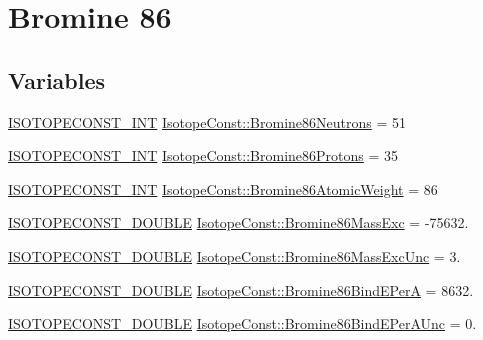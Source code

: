 \hypertarget{group___isotope_const-_bromine-_br86}{}\section{Bromine 86}
\label{group___isotope_const-_bromine-_br86}
\subsection*{Variables}
\begin{DoxyCompactItemize}
\item 
\mbox{\hyperlink{group___isotope_const-_macros_ga5f18360b3e99483a35c32d789e62621c}{I\+S\+O\+T\+O\+P\+E\+C\+O\+N\+S\+T\+\_\+\+I\+NT}} \mbox{\hyperlink{group___isotope_const-_bromine-_br86_gad9eb59cf3d3d80dbf95bb31a09ee368a}{Isotope\+Const\+::\+Bromine86\+Neutrons}} = 51
\item 
\mbox{\hyperlink{group___isotope_const-_macros_ga5f18360b3e99483a35c32d789e62621c}{I\+S\+O\+T\+O\+P\+E\+C\+O\+N\+S\+T\+\_\+\+I\+NT}} \mbox{\hyperlink{group___isotope_const-_bromine-_br86_ga6bf875a742fc88a09f3f350b8414d306}{Isotope\+Const\+::\+Bromine86\+Protons}} = 35
\item 
\mbox{\hyperlink{group___isotope_const-_macros_ga5f18360b3e99483a35c32d789e62621c}{I\+S\+O\+T\+O\+P\+E\+C\+O\+N\+S\+T\+\_\+\+I\+NT}} \mbox{\hyperlink{group___isotope_const-_bromine-_br86_ga7f596459dbaf3f36ede84da4ed1e4b80}{Isotope\+Const\+::\+Bromine86\+Atomic\+Weight}} = 86
\item 
\mbox{\hyperlink{group___isotope_const-_macros_ga8f45a7272ce02c0b4c65c44636ed719a}{I\+S\+O\+T\+O\+P\+E\+C\+O\+N\+S\+T\+\_\+\+D\+O\+U\+B\+LE}} \mbox{\hyperlink{group___isotope_const-_bromine-_br86_ga52a89187d9c12186da47cc46b6f839e4}{Isotope\+Const\+::\+Bromine86\+Mass\+Exc}} = -\/75632.
\item 
\mbox{\hyperlink{group___isotope_const-_macros_ga8f45a7272ce02c0b4c65c44636ed719a}{I\+S\+O\+T\+O\+P\+E\+C\+O\+N\+S\+T\+\_\+\+D\+O\+U\+B\+LE}} \mbox{\hyperlink{group___isotope_const-_bromine-_br86_ga29175a2199fb46e021d1b0687a711500}{Isotope\+Const\+::\+Bromine86\+Mass\+Exc\+Unc}} = 3.
\item 
\mbox{\hyperlink{group___isotope_const-_macros_ga8f45a7272ce02c0b4c65c44636ed719a}{I\+S\+O\+T\+O\+P\+E\+C\+O\+N\+S\+T\+\_\+\+D\+O\+U\+B\+LE}} \mbox{\hyperlink{group___isotope_const-_bromine-_br86_ga41cd032a0dc87c2df55a4efbd078ebd8}{Isotope\+Const\+::\+Bromine86\+Bind\+E\+PerA}} = 8632.
\item 
\mbox{\hyperlink{group___isotope_const-_macros_ga8f45a7272ce02c0b4c65c44636ed719a}{I\+S\+O\+T\+O\+P\+E\+C\+O\+N\+S\+T\+\_\+\+D\+O\+U\+B\+LE}} \mbox{\hyperlink{group___isotope_const-_bromine-_br86_ga178816d0ce161e8d776fb3cc3f369037}{Isotope\+Const\+::\+Bromine86\+Bind\+E\+Per\+A\+Unc}} = 0.

\end{DoxyCompactItemize}
